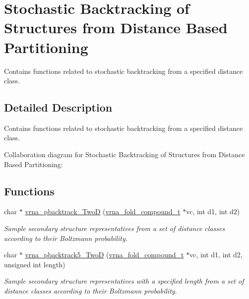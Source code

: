 \hypertarget{group__kl__neighborhood__stochbt}{}\section{Stochastic Backtracking of Structures from Distance Based Partitioning}
\label{group__kl__neighborhood__stochbt}


Contains functions related to stochastic backtracking from a specified distance class.  




\subsection{Detailed Description}
Contains functions related to stochastic backtracking from a specified distance class. 

Collaboration diagram for Stochastic Backtracking of Structures from Distance Based Partitioning\+:
\subsection*{Functions}
\begin{DoxyCompactItemize}
\item 
char $\ast$ \mbox{\hyperlink{group__kl__neighborhood__stochbt_ga14aceef73f83bbde77bb3a0ca06c9d13}{vrna\+\_\+pbacktrack\+\_\+\+TwoD}} (\mbox{\hyperlink{group__fold__compound_ga1b0cef17fd40466cef5968eaeeff6166}{vrna\+\_\+fold\+\_\+compound\+\_\+t}} $\ast$vc, int d1, int d2)
\begin{DoxyCompactList}\small\item\em Sample secondary structure representatives from a set of distance classes according to their Boltzmann probability. \end{DoxyCompactList}\item 
char $\ast$ \mbox{\hyperlink{group__kl__neighborhood__stochbt_ga6504913303bc325659c365d5f59b41e0}{vrna\+\_\+pbacktrack5\+\_\+\+TwoD}} (\mbox{\hyperlink{group__fold__compound_ga1b0cef17fd40466cef5968eaeeff6166}{vrna\+\_\+fold\+\_\+compound\+\_\+t}} $\ast$vc, int d1, int d2, unsigned int length)
\begin{DoxyCompactList}\small\item\em Sample secondary structure representatives with a specified length from a set of distance classes according to their Boltzmann probability. \end{DoxyCompactList}\end{DoxyCompactItemize}


